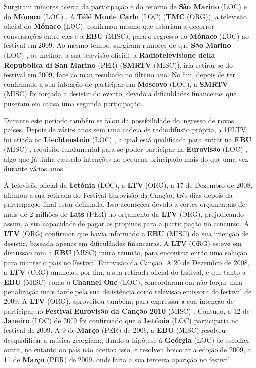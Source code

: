 \documentclass[12pt,a4paper]{article}
\begin{document}
Surgiram rumores acerca da participação e do retorno de \textbf{São Marino} (LOC) e do \textbf{Mónaco} (LOC) . A \textbf{Télé Monte Carlo} (LOC) (\textbf{TMC} (ORG)), a televisão oficial do \textbf{Mónaco} (LOC), confirmou mesmo que estariam a decorrer conversações entre eles e a \textbf{EBU} (MISC), para o regresso do \textbf{Mónaco} (LOC) ao festival em 2009. Ao mesmo tempo, surgiram rumores de que \textbf{São Marino} (LOC) , ou melhor, a sua televisão oficial, a \textbf{Radiotelevisione della Repubblica di San Marino} (PER) (\textbf{SMRTV} (MISC)), iria retirar-se do festival em 2009, face ao mau resultado no último ano. No fim, depois de ter confirmado a sua intenção de participar em \textbf{Moscovo} (LOC), a \textbf{SMRTV} (MISC) foi forçada a desistir do evento, devido a dificuldades financeiras que puseram em causa uma segunda participação.

Durante este período também se falou da possibilidade do ingresso de novos países. Depois de vários anos sem uma cadeia de radiodifusão própria, a 1FLTV foi criada no \textbf{Liechtenstein} (LOC) , a qual está qualificada para entrar na \textbf{EBU} (MISC) , requisito fundamental para se poder participar na \textbf{Eurovisão} (LOC) , algo que já tinha causado intenções no pequeno principado mais do que uma vez durante vários anos.

A televisão oficial da \textbf{Letónia} (LOC), a \textbf{LTV} (ORG), a 17 de Dezembro de 2008, afirmou a sua retirada do Festival Eurovisão da Canção, três dias depois da participação final estar deliniada. Isso aconteceu devido a cortes orçamentais de mais de 2 milhões de \textbf{Lats} (PER) no orçamento da \textbf{LTV} (ORG), prejudicando assim, a sua capacidade de pagar as propinas para a participação no concurso. A \textbf{LTV} (ORG) confirmou que havia informado a \textbf{EBU} (MISC) da sua intenção de desistir, baseada apenas em dificuldades financeiras. A \textbf{LTV} (ORG) esteve em discussão com a \textbf{EBU} (MISC) numa reunião, para encontrar então uma solução para manter o país no Festival Eurovisão da Canção. A 20 de Dezembro de 2008, a \textbf{LTV} (ORG) anunciou por fim, a sua retirada oficial do festival, e que tanto a \textbf{EBU} (MISC) como o \textbf{Channel One} (LOC), concordaram em não forçar uma penalização mais tarde pela sua desistência como televisão emissora do festival de 2009. A \textbf{LTV} (ORG), aproveitou também, para expressar a sua intenção de participar no \textbf{Festival Eurovisão da Canção 2010} (MISC) . Contudo, a 12 de \textbf{Janeiro} (LOC) de 2009 foi confirmado que a \textbf{Letónia} (LOC) participaria no festival de 2009. A 9 de \textbf{Março} (PER) de 2009, a \textbf{EBU} (MISC) resolveu desqualificar a música georgiana, dando a hipótese à \textbf{Geórgia} (LOC) de escolher outra, no entanto oo país não aceitou isso, e resolveu boicotar a edição de 2009, a 11 de \textbf{Março} (PER) de 2009, onde faria a sua terceira aparição no festival.
\end{document}
